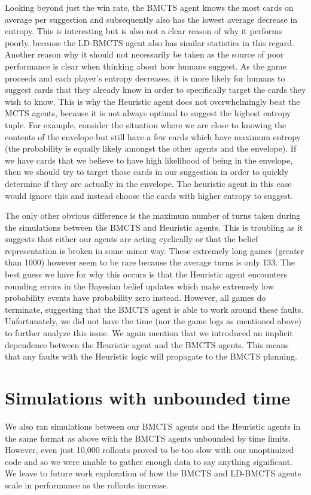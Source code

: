 \documentclass[msc, ai, twoside, notimes, logo, parskip, leftchapter, normalheadings]{infthesis}
\begin{document}
Looking beyond just the win rate, the BMCTS agent knows the most cards on average per suggestion and subsequently also has the lowest average decrease in entropy. This is interesting but is also not a clear reason of why it performs poorly, because the LD-BMCTS agent also has similar statistics in this regard. Another reason why it should not necessarily be taken as the source of poor performance is clear when thinking about how humans suggest. As the game proceeds and each player's entropy decreases, it is more likely for humans to suggest cards that they already know in order to specifically target the cards they wish to know. This is why the Heuristic agent does not overwhelmingly beat the MCTS agents, because it is not always optimal to suggest the highest entropy tuple. For example, consider the situation where we are close to knowing the contents of the envelope but still have a few cards which have maximum entropy (the probability is equally likely amongst the other agents and the envelope). If we have cards that we believe to have high likelihood of being in the envelope, then we should try to target those cards in our suggestion in order to quickly determine if they are actually in the envelope. The heuristic agent in this case would ignore this and instead choose the cards with higher entropy to suggest. 

The only other obvious difference is the maximum number of turns taken during the simulations between the BMCTS and Heuristic agents. This is troubling as it suggests that either our agents are acting cyclically or that the belief representation is broken in some minor way. These extremely long games (greater than 1000) however seem to be rare because the average turns is only 133. The best guess we have for why this occurs is that the Heuristic agent encounters rounding errors in the Bayesian belief updates which make extremely low probability events have probability zero instead. However, all games do terminate, suggesting that the BMCTS agent is able to work around these faults. Unfortunately, we did not have the time (nor the game logs as mentioned above) to further analyze this issue. We again mention that we introduced an implicit dependence between the Heuristic agent and the BMCTS agents. This means that any faults with the Heuristic logic will propagate to the BMCTS planning.

\section{Simulations with unbounded time}
We also ran simulations between our BMCTS agents and the Heuristic agents in the same format as above with the BMCTS agents unbounded by time limits. However, even just 10,000 rollouts proved to be too slow with our unoptimized code and so we were unable to gather enough data to say anything significant. We leave to future work exploration of how the BMCTS and LD-BMCTS agents scale in performance as the rollouts increase.
\end{document}
